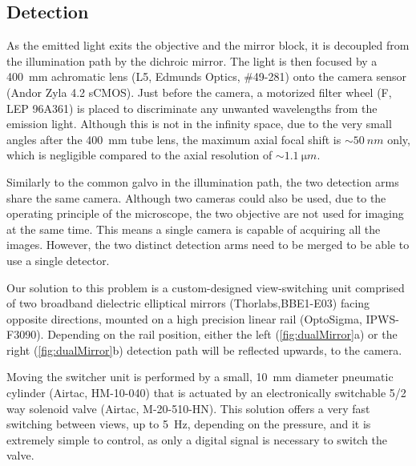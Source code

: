   \subsection{Detection}
    As the emitted light exits the objective and the mirror block, it is decoupled from the illumination path by the dichroic mirror. The light is then focused by a \SI{400}{mm} achromatic lens (L5, Edmunds Optics, \#49-281) onto the camera sensor (Andor Zyla 4.2 sCMOS). Just before the camera, a motorized filter wheel (F, LEP 96A361) is placed to discriminate any unwanted wavelengths from the emission light. Although this is not in the infinity space, due to the very small angles after the \SI{400}{mm} tube lens, the maximum axial focal shift is $\sim \SI{50}{nm}$ only, which is negligible compared to the axial resolution of $\sim \SI{1.1}{\micro m}$.

    Similarly to the common galvo in the illumination path, the two detection arms share the same camera. Although two cameras could also be used, due to the operating principle of the microscope, the two objective are not used for imaging at the same time. This means a single camera is capable of acquiring all the images. However, the two distinct detection arms need to be merged to be able to use a single detector.
    
    Our solution to this problem is a custom-designed view-switching unit comprised of two broadband dielectric elliptical mirrors (Thorlabs,BBE1-E03) facing opposite directions, mounted on a high precision linear rail (OptoSigma, IPWS-F3090). Depending on the rail position, either the left (\autoref{fig:dualMirror}a) or the right (\autoref{fig:dualMirror}b) detection path will be reflected upwards, to the camera. 

    Moving the switcher unit is performed by a small, \SI{10}{mm} diameter pneumatic cylinder (Airtac, HM-10-040) that is actuated by an electronically switchable 5/2 way solenoid valve (Airtac, M-20-510-HN). This solution offers a very fast switching between views, up to \SI{5}{Hz}, depending on the pressure, and it is extremely simple to control, as only a digital signal is necessary to switch the valve. 

